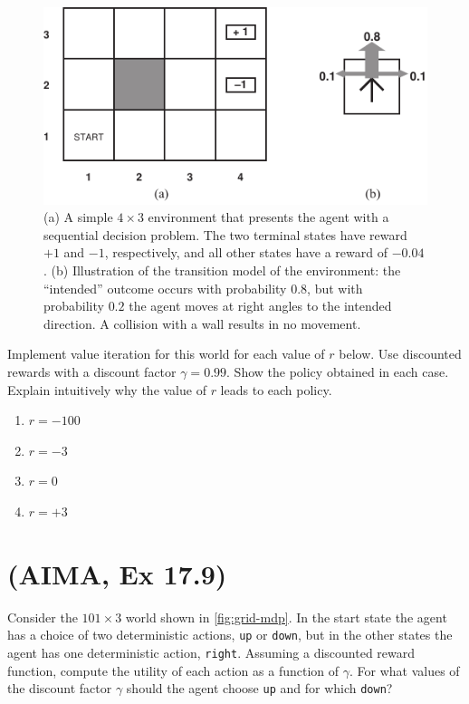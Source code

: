 \documentclass[11pt, a4paper]{article}
\begin{document}
\begin{figure}[h]
    \centering
    \includegraphics{figures/e6_sequential.pdf}
    \caption{(a) A simple $4\times 3$ environment that presents the agent with a sequential decision problem. The two terminal states have reward $+1$ and $-1$, respectively, and all other states have a reward of $-0.04$. (b) Illustration of the transition model of the environment: the \enquote{intended} outcome occurs with probability $0.8$, but with probability $0.2$ the agent moves at right angles to the intended direction. A collision with a wall results in no movement.}
    \label{fig:sequential}
\end{figure}

Implement value iteration for this world for each value of $r$ below. Use discounted rewards with a discount factor $\gamma = \num{0.99}$. Show
the policy obtained in each case. Explain intuitively why the value of $r$ leads to each policy.

\begin{enumerate}
    \item $r = -100$
    \item $r = -3$
    \item $r = 0$
    \item $r = +3$
\end{enumerate}

\newpage

\section{(AIMA, Ex 17.9)} \label{sec:17.9}

Consider the $101 \times 3$ world shown in \ref{fig:grid-mdp}. In the start state the agent has a choice of two deterministic actions, \texttt{up} or \texttt{down}, but in the other states the agent has one deterministic action, \texttt{right}. Assuming a discounted reward function, compute the utility of each action as a function of $\gamma$. For what values of the discount factor $\gamma$ should the agent choose \texttt{up} and for which \texttt{down}?
\end{document}
